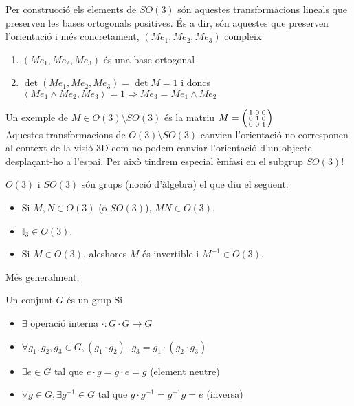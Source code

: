 \documentclass[../main.tex]{subfiles}
\begin{document}
Per construcció els elements de $SO(3)$ són aquestes transformacions lineals que preserven les
bases ortogonals positives. És a dir, són aquestes que preserven l'orientació i més concretament,
$\left(Me_1, Me_2, Me_3\right)$ compleix
\begin{enumerate}
    \item $\left(Me_1, Me_2, Me_3\right)$ és una base ortogonal
    \item $\det{\left(Me_1, Me_2, Me_3\right)} = \det{M} = 1$ i doncs $\left\langle Me_1\wedge Me_2, Me_3\right\rangle = 1 \Rightarrow Me_3 = Me_1\wedge Me_2$
\end{enumerate}
Un exemple de $M \in O(3)\setminus SO(3)$ és la matriu $M = \begin{psmallmatrix}
    1 & 0 & 0\\
    0 & 1 & 0\\
    0 & 0 & 1
\end{psmallmatrix}$\\
Aquestes transformacions de $O(3)\setminus SO(3)$ canvien l'orientació no corresponen al context de
la visió 3D com no podem canviar l'orientació d'un objecte desplaçant-ho a l'espai. Per això tindrem
especial èmfasi en el subgrup $SO(3)$!
\begin{obs}
    $O(3)$ i $SO(3)$ són grups (noció d'àlgebra) el que diu el següent:
    \begin{itemize}
        \item Si $M, N \in O(3)$ (o $SO(3)$), $MN \in O(3)$.
        \item $\mathbb{I}_3 \in O(3)$.
        \item Si $M \in O(3)$, aleshores $M$ és invertible i $M^{-1} \in O(3)$.
    \end{itemize}    
\end{obs}
Més generalment,
\begin{definicio}
    Un conjunt $G$ és un grup Si
    \begin{itemize}
        \item $\exists$ operació interna $\cdot : G\cdot G \to G$
        \item $\forall g_1, g_2, g_3 \in G, (g_1\cdot g_2) \cdot g_3 = g_1\cdot (g_2 \cdot g_3)$
        \item $\exists e \in G$ tal que $e\cdot g = g \cdot e = g$ (element neutre)
        \item $\forall g \in G, \exists g^{-1} \in G$ tal que $ g\cdot g^{-1} = g^{-1}g = e$ (inversa)
    \end{itemize}
\end{definicio}
\end{document}
